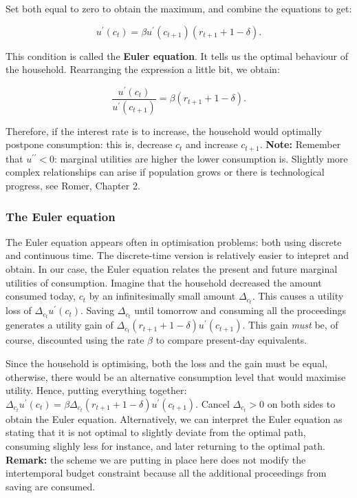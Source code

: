 \documentclass[11pt,a4paper,english]{article}
\begin{document}
Set both equal to zero to obtain the maximum, and combine the equations
to get:

\[u^{\prime}(c_{t}) = \beta u^{\prime}(c_{t+1})(r_{t+1}+1-\delta).\]

This condition is called the \textbf{Euler equation}. It tells us the
optimal behaviour of the household. Rearranging the expression a little
bit, we obtain:

\[\frac{u^{\prime}(c_{t})}{u^{\prime}(c_{t+1})} = \beta (r_{t+1} + 1 - \delta).\]

Therefore, if the interest rate is to increase, the household would
optimally postpone consumption: this is, decrease \(c_{t}\) and increase
\(c_{t+1}.\) \textbf{Note:} Remember that \(u^{\prime \prime} < 0\):
marginal utilities are higher the lower consumption is. Slightly more
complex relationships can arise if population grows or there is
technological progress, see Romer, Chapter 2.

\hypertarget{the-euler-equation}{%
\subsubsection{The Euler equation}\label{the-euler-equation}}

The Euler equation appears often in optimisation problems: both using
discrete and continuous time. The discrete-time version is relatively
easier to intepret and obtain. In our case, the Euler equation relates
the present and future marginal utilities of consumption. Imagine that
the household decreased the amount consumed today, \(c_{t}\) by an
infinitesimally small amount \(\Delta_{c_{t}}\). This causes a utility
loss of \(\Delta_{c_{t}} u^{\prime}(c_{t})\). Saving \(\Delta_{c_{t}}\)
until tomorrow and consuming all the proceedings generates a utility
gain of \(\Delta_{c_{t}}(r_{t+1} + 1 - \delta) u^{\prime}(c_{t+1})\).
This gain \emph{must} be, of course, discounted using the rate \(\beta\)
to compare present-day equivalents.

Since the household is optimising, both the loss and the gain must be
equal, otherwise, there would be an alternative consumption level that
would maximise utility. Hence, putting everything together:
\(\Delta_{c_{t}} u^{\prime}(c_{t}) = \beta \Delta_{c_{t}} (r_{t+1} + 1 - \delta) u^{\prime}(c_{t+1}).\)
Cancel \(\Delta_{c_{t}} > 0\) on both sides to obtain the Euler
equation. Alternatively, we can interpret the Euler equation as stating
that it is not optimal to slightly deviate from the optimal path,
consuming slighly less for instance, and later returning to the optimal
path. \textbf{Remark:} the scheme we are putting in place here does not
modify the intertemporal budget constraint because all the additional
proceedings from saving are consumed.
\end{document}
